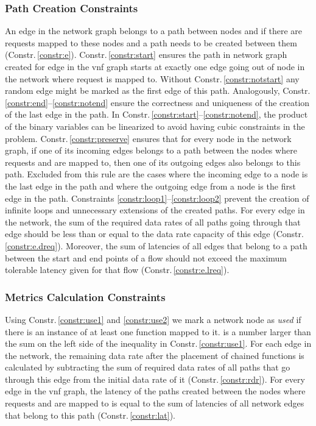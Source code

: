 \documentclass[10pt,a4paper,conference]{IEEEtran}
\begin{document}
\subsubsection{Path Creation Constraints}
{\footnotesize


}An edge in the network graph belongs to a path between nodes  and  if 
there are requests mapped to these nodes and a path needs to be created 
between them (Constr.\,\ref{constr:e}). Constr.\,\ref{constr:start} ensures 
the path in network graph created for edge  in the \ac{vnf} graph starts 
at exactly one edge going out of node  in the network where request  is mapped
to. Without Constr.\,\ref{constr:notstart} any random edge might be marked as 
the first edge of this path. Analogously, Constr.\,\ref{constr:end}--\ref{constr:notend}
ensure the correctness and uniqueness of the creation of the last edge in the path.
In Constr.\,\ref{constr:start}--\ref{constr:notend}, the product of the binary
variables can be linearized to avoid having cubic constraints in the problem.
Constr.\,\ref{constr:preserve} ensures that for every node  in the network 
graph, if one of its incoming edges belongs to a path between the nodes where 
requests  and  are mapped to, then one of its outgoing edges also 
belongs to this path. Excluded from this rule are the cases where the incoming 
edge to a node is the last edge in the path and where the outgoing edge from a 
node is the first edge in the path. Constraints \ref{constr:loop1}--\ref{constr:loop2}
prevent the creation of infinite loops and unnecessary extensions of the created paths.
For every edge in the network, the sum of the required data rates of all paths going
through that edge should be less than or equal to the data rate capacity of this edge (Constr.\,\ref{constr:e.dreq}).
Moreover, the sum of latencies of all edges that belong to a path between the start 
and end points of a flow should not exceed the maximum tolerable latency given for that flow
(Constr.\,\ref{constr:e.lreq}).

\subsubsection{Metrics Calculation Constraints}
{\footnotesize

}Using Constr.\,\ref{constr:use1} and \ref{constr:use2} we mark a network node
as \emph{used} if there is an instance of at least one function mapped to it.
 is a number larger than the sum on the left side 
of the inequality in Constr.\,\ref{constr:use1}. For each edge  in the
network, the remaining data rate after the placement of chained functions is calculated
by subtracting the sum of required data rates of all paths that go through this 
edge from the initial data rate of it (Constr.\,\ref{constr:rdr}). For every
edge  in the \ac{vnf} graph, the latency of the paths created between the 
nodes where requests  and  are mapped to is equal to the sum of latencies
of all network edges that belong to this path (Constr.\,\ref{constr:lat}).
\end{document}
